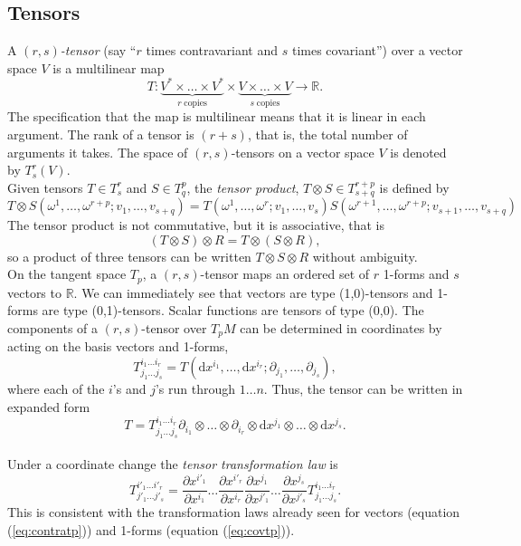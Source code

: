 
\subsection{Tensors}

A $(r,s)$\textit{-tensor} (say ``$r$ times contravariant and $s$ times
covariant'') over a vector space $V$ is a multilinear map 
\[ T:\underbrace{V^*\times \dots \times V^* }_{r \;\mbox{copies}}\times
\underbrace{V \times \dots \times V}_{s\; \mbox{copies}} \rightarrow \mathbb{R}.
\]
The specification that the map is multilinear means that it is linear in each
argument. The rank of a tensor is $(r+s)$, that is, the total number of
arguments it takes. The space of $(r,s)$-tensors on a vector space $V$ is
denoted by $T^r_s(V)$. \\

Given tensors $T\in T^r_s$ and $S\in T^p_q$, the \textit{tensor product},
$T\otimes S \in T^{r+p}_{s+q}$ is defined by
\[
T\otimes S (\omega^1,\dots,\omega^{r+p};v_1,\dots,v_{s+q}) =
 T(\omega^1,\dots,\omega^r;v_1,\dots,v_s)S(\omega^{r+1},\dots,\omega^{r+p};v_{
s+1},\dots,v_{s+q}) \]
The tensor product is not commutative, but it is associative, that is
\[ (T\otimes S)\otimes R =T\otimes(S\otimes R), \]
so a product of three tensors can be written $T\otimes S \otimes R$ without
ambiguity.\\

On the tangent space $T_p$, a $(r,s)$-tensor maps an ordered set of $r$ 1-forms
and $s$ vectors to $\mathbb{R}$. We can immediately see that vectors are type
(1,0)-tensors and 1-forms are type (0,1)-tensors. Scalar functions are tensors
of type (0,0). The components of a $(r,s)$-tensor over $T_p M$ can be determined
in coordinates by acting on the basis vectors and 1-forms,
\[ T^{i_1\dots i_r}_{j_1\dots
j_s}=T(\mbox{d}x^{i_1},\dots,\mbox{d}x^{i_r};\partial_{j_1},\dots,\partial_{j_s}
), \]
where each of the $i$'s and $j$'s run through $1\dots n$. Thus, the tensor can
be written in expanded form
\[ T=T^{i_1\dots i_r}_{j_1\dots j_s}\partial_{i_1}\otimes \dots \otimes
\partial_{i_r}\otimes \mbox{d}x^{j_1}\otimes \dots \otimes \mbox{d}x^{j_s}. \]\\

Under a coordinate change the \textit{tensor transformation law} is
\begin{equation} T^{i'_1\dots i'_r}_{j'_1 \dots j'_s}=\frac{\partial
x^{i'_1}}{\partial x^{i_1}}\dots \frac{\partial x^{i'_r}}{\partial
x^{i_r}}\frac{\partial x^{j_1}}{\partial x^{j'_1}}\dots \frac{\partial
x^{j_s}}{\partial x^{j'_s}} T^{i_1\dots i_r}_{j_1 \dots j_s}.
\label{eq:ttl}\end{equation}
This is consistent with the transformation laws already seen for vectors
(equation (\ref{eq:contratp})) and 1-forms (equation (\ref{eq:covtp})).\\

